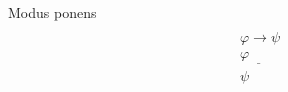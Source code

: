 \begin{ruleinf} \label{relinf_impadd} Modus ponens
	\begin{equation}
	\begin{gathered} \\
    \varphi \to \psi \\
	\underline {\varphi \quad \quad } \\
	\psi \quad \quad
	\end{gathered}
	\end{equation}
\end{ruleinf}
